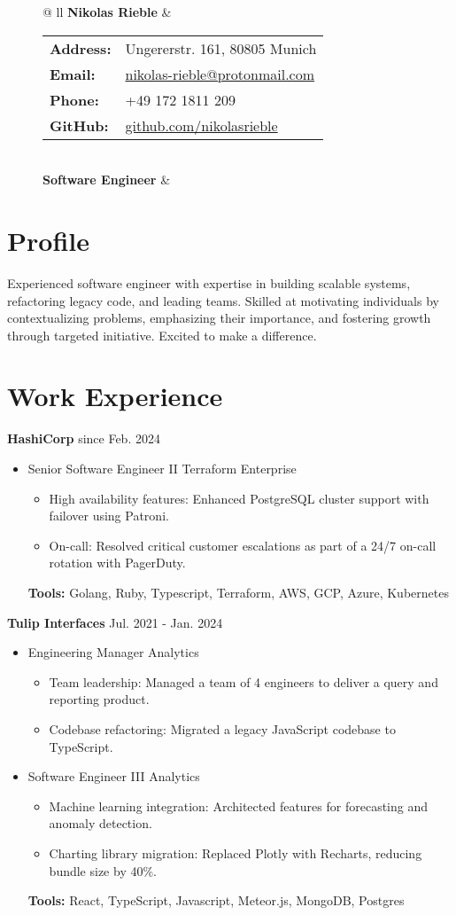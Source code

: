 \documentclass[letterpaper,11pt]{article}
\newcommand{\roleSpacing}{\vspace{4pt}}
\newcommand{\role}[2]{\item{#1 \hfill #2 \\}} %
\newcommand{\station}[2]{\textbf{#1}  \hfill #2 \\} %
\newcommand{\project}[2]{\item\small{#1: #2}} %
\newcommand{\resumeSubHeadingListStart}{\begin{itemize}[leftmargin=*]}
\newcommand{\resumeSubHeadingListEnd}{\end{itemize}}
\newcommand{\projectliststart}{\begin{itemize}[leftmargin=*] \vspace{-5pt} }
\newcommand{\projectlistend}{\end{itemize}\vspace{-5pt}}
\begin{document}
\addtolength{\tabcolsep}{4pt}    %
{\renewcommand{\arraystretch}{1} %
\begin{figure}[t]
	\centering
	\begin{tabular*}{\textwidth}{@{\extracolsep{\fill}} ll}
		 \textbf{{\Huge Nikolas Rieble}} & 
		\begin{tabular}{@{}ll@{}}
			\textbf{Address:} & Ungererstr. 161, 80805 Munich \\
			\textbf{Email:} & \href{mailto:nikolas-rieble@protonmail.com}{nikolas-rieble@protonmail.com} \\
			\textbf{Phone:} & +49 172 1811 209 \\
			\textbf{GitHub:} & \href{https://github.com/nikolasrieble}{github.com/nikolasrieble} \\
		\end{tabular} \\
		\textbf{Software Engineer} & \\
	\end{tabular*}
\end{figure}
}

\section{Profile}
Experienced software engineer with expertise in building scalable systems, refactoring legacy code, and leading teams. Skilled at motivating individuals by contextualizing problems, emphasizing their importance, and fostering growth through targeted initiative. Excited to make a difference.

\section{Work Experience}

\station{HashiCorp}{since Feb. 2024}
\resumeSubHeadingListStart
\role{Senior Software Engineer II}{Terraform Enterprise}
\projectliststart
\project{High availability features}{Enhanced PostgreSQL cluster support with failover using Patroni.}
\project{On-call}{Resolved critical customer escalations as part of a 24/7 on-call rotation with PagerDuty.}
\projectlistend
\textbf{Tools:} Golang, Ruby, Typescript, Terraform, AWS, GCP, Azure, Kubernetes
\resumeSubHeadingListEnd
\roleSpacing
\station{Tulip Interfaces}{Jul. 2021 - Jan. 2024}
\resumeSubHeadingListStart
\role{Engineering Manager}{Analytics}
\projectliststart
\project{Team leadership}{Managed a team of 4 engineers to deliver a query and reporting product.}
\project{Codebase refactoring}{Migrated a legacy JavaScript codebase to TypeScript.}
\projectlistend
\roleSpacing
\role{Software Engineer III}{Analytics}
\projectliststart
\project{Machine learning integration}{Architected features for forecasting and anomaly detection.}
\project{Charting library migration}{Replaced Plotly with Recharts, reducing bundle size by 40\%.}
\projectlistend
\textbf{Tools:} React, TypeScript, Javascript, Meteor.js, MongoDB, Postgres
\resumeSubHeadingListEnd
\end{document}
